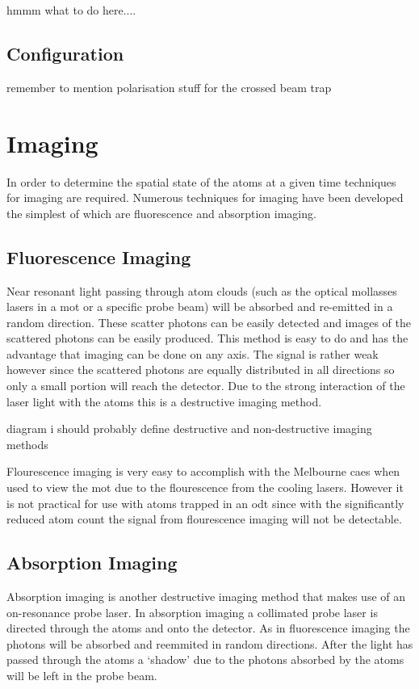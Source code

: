 {\color{red} hmmm what to do here....}

\subsection{Configuration}

remember to mention polarisation stuff for the crossed beam trap

\section{Imaging}

In order to determine the spatial state of the atoms at a given time techniques for imaging are required. Numerous techniques for imaging have been developed the simplest of which are fluorescence and absorption imaging.

\subsection{Fluorescence Imaging}

Near resonant light passing through atom clouds (such as the optical mollasses lasers in a \gls{mot} or a specific probe beam) will be absorbed and re-emitted in a random direction. These scatter photons can be easily detected and images of the scattered photons can be easily produced. This method is easy to do and has the advantage that imaging can be done on any axis. The signal is rather weak however since the scattered photons are equally distributed in all directions so only a small portion will reach the detector. Due to the strong interaction of the laser light with the atoms this is a destructive imaging method.

{\color{red} diagram}
{\color{red} i should probably define destructive and non-destructive imaging methods}

Flourescence imaging is very easy to accomplish with the Melbourne \gls{caes} when used to view the \gls{mot} due to the flourescence from the cooling lasers. However it is not practical for use with atoms trapped in an \gls{odt} since with the significantly reduced atom count the signal from flourescence imaging will not be detectable.

\subsection{Absorption Imaging}

Absorption imaging is another destructive imaging method that makes use of an on-resonance probe laser. In absorption imaging a collimated probe laser is directed through the atoms and onto the detector. As in fluorescence imaging the photons will be absorbed and reemmited in random directions. After the light has passed through the atoms a `shadow' due to the photons absorbed by the atoms will be left in the probe beam.

